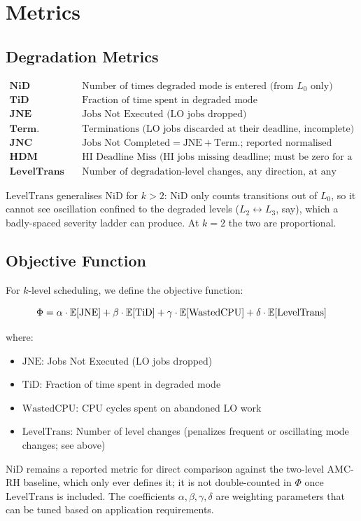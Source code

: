 \documentclass{article}
\begin{document}
\section{Metrics}

\subsection{Degradation Metrics}

\begin{align*}
\textbf{NiD} &\quad \text{Number of times degraded mode is entered (from } L_0 \text{ only)} \\
\textbf{TiD} &\quad \text{Fraction of time spent in degraded mode} \\
\textbf{JNE} &\quad \text{Jobs Not Executed (LO jobs dropped)} \\
\textbf{Term.} &\quad \text{Terminations (LO jobs discarded at their deadline, incomplete)} \\
\textbf{JNC} &\quad \text{Jobs Not Completed} = \text{JNE} + \text{Term.}\text{; reported normalised} \\
\textbf{HDM} &\quad \text{HI Deadline Miss (HI jobs missing deadline; must be zero for a safe scheme)} \\
\textbf{LevelTrans} &\quad \text{Number of degradation-level changes, any direction, at any depth}
\end{align*}

$\mathrm{LevelTrans}$ generalises $\mathrm{NiD}$ for $k > 2$: $\mathrm{NiD}$ only
counts transitions out of $L_0$, so it cannot see oscillation confined to the
degraded levels ($L_2 \leftrightarrow L_3$, say), which a badly-spaced severity
ladder can produce. At $k = 2$ the two are proportional.

\subsection{Objective Function}

For $k$-level scheduling, we define the objective function:

\[
\Phi = \alpha \cdot \mathbb{E}[\mathrm{JNE}] + \beta \cdot \mathbb{E}[\mathrm{TiD}] + \gamma \cdot \mathbb{E}[\mathrm{WastedCPU}] + \delta \cdot \mathbb{E}[\mathrm{LevelTrans}]
\]

where:
\begin{itemize}
    \item $\mathrm{JNE}$: Jobs Not Executed (LO jobs dropped)
    \item $\mathrm{TiD}$: Fraction of time spent in degraded mode
    \item $\mathrm{WastedCPU}$: CPU cycles spent on abandoned LO work
    \item $\mathrm{LevelTrans}$: Number of level changes (penalizes frequent or oscillating mode changes; see above)
\end{itemize}
$\mathrm{NiD}$ remains a reported metric for direct comparison against the
two-level AMC-RH baseline, which only ever defines it; it is not
double-counted in $\Phi$ once $\mathrm{LevelTrans}$ is included.
The coefficients $\alpha, \beta, \gamma, \delta$ are weighting parameters that can be tuned based on
application requirements.
\end{document}
